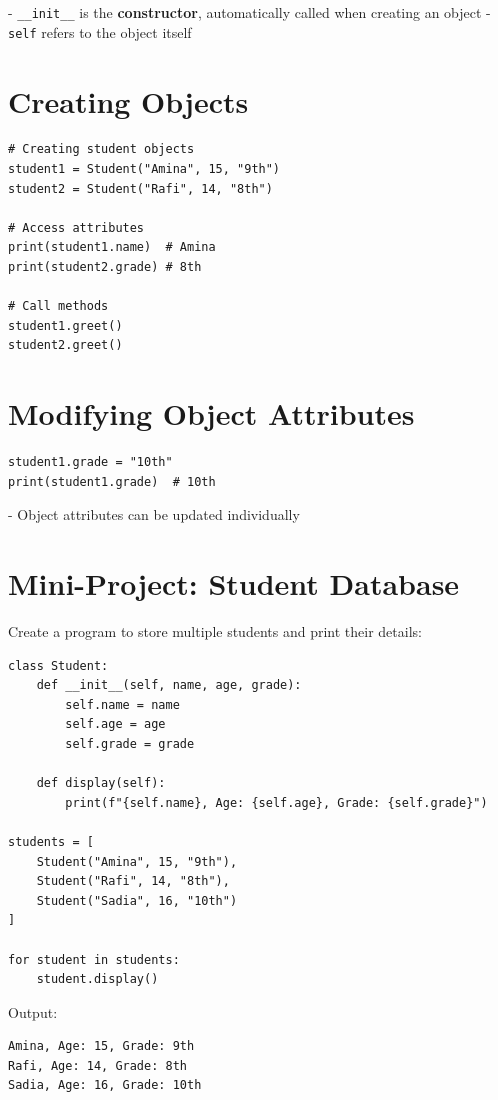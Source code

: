 - \texttt{\_\_init\_\_} is the \textbf{constructor}, automatically called when creating an object  
- \texttt{self} refers to the object itself  

\section{Creating Objects}

\begin{verbatim}
# Creating student objects
student1 = Student("Amina", 15, "9th")
student2 = Student("Rafi", 14, "8th")

# Access attributes
print(student1.name)  # Amina
print(student2.grade) # 8th

# Call methods
student1.greet()
student2.greet()
\end{verbatim}

\section{Modifying Object Attributes}

\begin{verbatim}
student1.grade = "10th"
print(student1.grade)  # 10th
\end{verbatim}

- Object attributes can be updated individually  

\section{Mini-Project: Student Database}

Create a program to store multiple students and print their details:

\begin{verbatim}
class Student:
    def __init__(self, name, age, grade):
        self.name = name
        self.age = age
        self.grade = grade

    def display(self):
        print(f"{self.name}, Age: {self.age}, Grade: {self.grade}")

students = [
    Student("Amina", 15, "9th"),
    Student("Rafi", 14, "8th"),
    Student("Sadia", 16, "10th")
]

for student in students:
    student.display()
\end{verbatim}

Output:

\begin{verbatim}
Amina, Age: 15, Grade: 9th
Rafi, Age: 14, Grade: 8th
Sadia, Age: 16, Grade: 10th
\end{verbatim}

